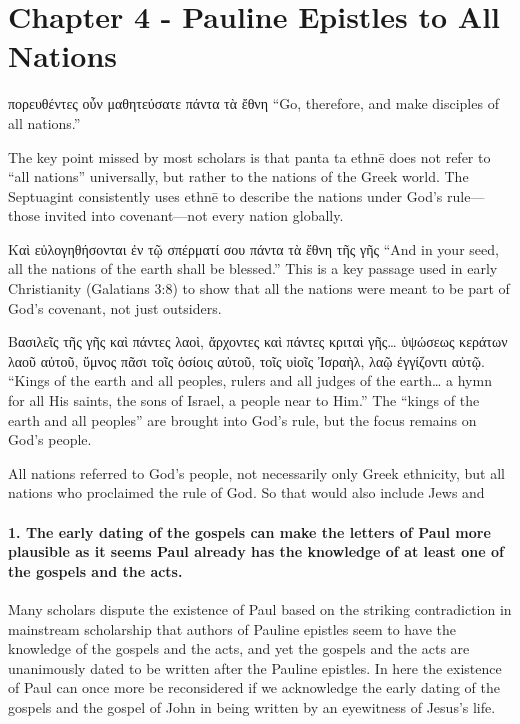 \section{Chapter 4 - Pauline Epistles to All Nations}\label{par:chapter-4---pauline-epistles-to-all-nations}

πορευθέντες οὖν μαθητεύσατε πάντα τὰ ἔθνη ``Go, therefore, and make disciples of all nations.''

The key point missed by most scholars is that panta ta ethnē does not refer to ``all nations'' universally, but rather to the nations of the Greek world.
The Septuagint consistently uses ethnē to describe the nations under God's rule---those invited into covenant---not every nation globally.

Καὶ εὐλογηθήσονται ἐν τῷ σπέρματί σου πάντα τὰ ἔθνη τῆς γῆς ``And in your seed, all the nations of the earth shall be blessed.'' This is a key passage used in early Christianity (Galatians 3:8) to show that all the nations were meant to be part of God's covenant, not just outsiders.

Βασιλεῖς τῆς γῆς καὶ πάντες λαοὶ, ἄρχοντες καὶ πάντες κριταὶ γῆς\ldots{} ὑψώσεως κεράτων λαοῦ αὐτοῦ, ὕμνος πᾶσι τοῖς ὁσίοις αὐτοῦ, τοῖς υἱοῖς Ἰσραὴλ, λαῷ ἐγγίζοντι αὐτῷ.
``Kings of the earth and all peoples, rulers and all judges of the earth\ldots{} a hymn for all His saints, the sons of Israel, a people near to Him.'' The ``kings of the earth and all peoples'' are brought into God's rule, but the focus remains on God's people.

All nations referred to God's people, not necessarily only Greek ethnicity, but all nations who proclaimed the rule of God.
So that would also include Jews and

\paragraph{1.
The early dating of the gospels can make the letters of Paul more plausible as it seems Paul already has the knowledge of at least one of the gospels and the acts.}\label{par:the-early-dating-of-the-gospels-can-make-the-letters-of-paul-more-plausible-as-it-seems-paul-already-has-the-knowledge-of-at-least-one-of-the-gospels-and-the-acts.}

Many scholars dispute the existence of Paul based on the striking contradiction in mainstream scholarship that authors of Pauline epistles seem to have the knowledge of the gospels and the acts, and yet the gospels and the acts are unanimously dated to be written after the Pauline epistles.
In here the existence of Paul can once more be reconsidered if we acknowledge the early dating of the gospels and the gospel of John in being written by an eyewitness of Jesus's life.

